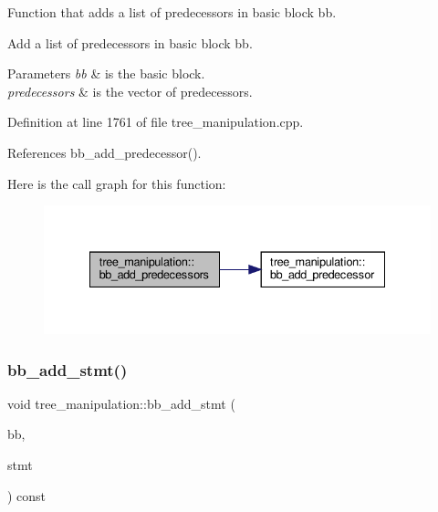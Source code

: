 Function that adds a list of predecessors in basic block bb. 

Add a list of predecessors in basic block bb.


\begin{DoxyParams}{Parameters}
{\em bb} & is the basic block. \\
\hline
{\em predecessors} & is the vector of predecessors. \\
\hline
\end{DoxyParams}


Definition at line 1761 of file tree\+\_\+manipulation.\+cpp.



References bb\+\_\+add\+\_\+predecessor().

Here is the call graph for this function\+:
\nopagebreak
\begin{figure}[H]
\begin{center}
\leavevmode
\includegraphics[width=335pt]{d0/d99/classtree__manipulation_ac4ed822186d388113d2229bd736f6cba_cgraph}
\end{center}
\end{figure}
\mbox{\label{classtree__manipulation_a601df5dd202432b92ee58a8b04f1af52}} 
\subsubsection{\texorpdfstring{bb\+\_\+add\+\_\+stmt()}{bb\_add\_stmt()}}
{\footnotesize\ttfamily void tree\+\_\+manipulation\+::bb\+\_\+add\+\_\+stmt (\begin{DoxyParamCaption}\item[{bloc\+Ref \&}]{bb,  }\item[{const \hyperlink{tree__node_8hpp_a6ee377554d1c4871ad66a337eaa67fd5}{tree\+\_\+node\+Ref} \&}]{stmt }\end{DoxyParamCaption}) const}



